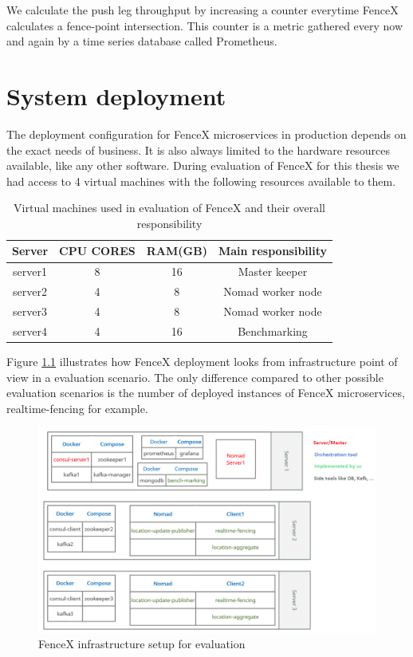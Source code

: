 \documentclass[a4]{report}
\begin{document}
    We calculate the push leg throughput by increasing a counter everytime FenceX calculates a fence-point intersection.
    This counter is a metric gathered every now and again by a time series database called Prometheus.


    \chapter{System deployment}
    The deployment configuration for FenceX microservices in production depends on the exact needs of business.
    It is also always limited to the hardware resources available, like any other software.
    During evaluation of FenceX for this thesis we had access to 4 virtual machines with the following resources
    available to them.

    \begin{table}[h!]
        \centering
        \begin{tabular}{|c|c|c|c|}
            \hline
            Server  & CPU CORES & RAM(GB) & Main responsibility \\
            \hline
            server1 & 8         & 16      & Master keeper       \\
            server2 & 4         & 8       & Nomad worker node   \\
            server3 & 4         & 8       & Nomad worker node   \\
            server4 & 4         & 16      & Benchmarking        \\
            \hline
        \end{tabular}
        \caption{Virtual machines used in evaluation of FenceX and their overall responsibility}
        \label{table:vms}
    \end{table}

    Figure \ref{fig:infrastructure} illustrates how FenceX deployment looks from infrastructure point of view in a
    evaluation scenario.
    The only difference compared to other possible evaluation scenarios is the number of deployed instances of FenceX
    microservices, realtime-fencing for example.

    \begin{figure}[h!]
        \centering
        \caption{FenceX infrastructure setup for evaluation}
        \label{fig:infrastructure}
        \includegraphics[scale=0.6]{images/Infrsutracture.png}
    \end{figure}
\end{document}
